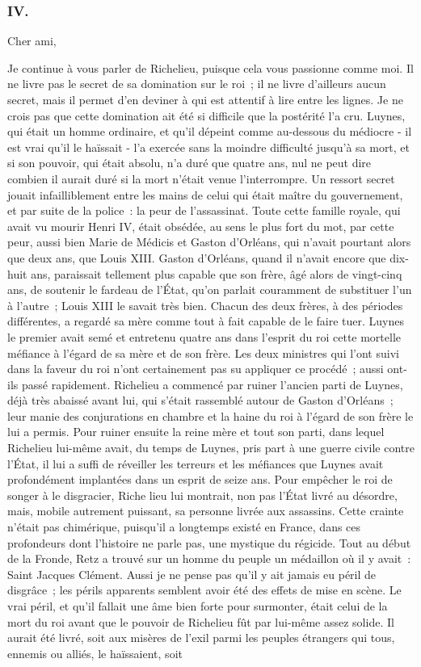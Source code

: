 \documentclass[french,twoside]{book} %
\begin{document}
\subsubsection[IV.]{IV.}
\noindent Cher ami,\par
Je continue à vous parler de Richelieu, puisque cela vous passionne com­me moi. Il ne livre pas le secret de sa domination sur le roi ; il ne livre d'ailleurs aucun secret, mais il permet d'en deviner à qui est attentif à lire entre les lignes. Je ne crois pas que cette domination ait été si difficile que la postérité l'a cru. Luynes, qui était un homme ordinaire, et qu'il dépeint comme au-dessous du médiocre - il est vrai qu'il le haïssait - l'a exercée sans la moindre difficulté jusqu'à sa mort, et si son pouvoir, qui était absolu, n'a duré que quatre ans, nul ne peut dire combien il aurait duré si la mort n'était venue l'interrompre. Un ressort secret jouait infailliblement entre les mains de celui qui était maître du gouvernement, et par suite de la police : la peur de l'assas­sinat. Toute cette famille royale, qui avait vu mourir Henri IV, était obsédée, au sens le plus fort du mot, par cette peur, aussi bien Marie de Médicis et Gaston d'Orléans, qui n'avait pourtant alors que deux ans, que Louis XIII. Gaston d'Orléans, quand il n'avait encore que dix-huit ans, paraissait tellement plus capable que son frère, âgé alors de vingt-cinq ans, de soutenir le fardeau de l'État, qu'on parlait couramment de substituer l'un à l'autre ; Louis XIII le savait très bien. Chacun des deux frères, à des périodes différentes, a regardé sa mère comme tout à fait capable de le faire tuer. Luynes le premier avait semé et entretenu quatre ans dans l'esprit du roi cette mortelle méfiance à l'égard de sa mère et de son frère. Les deux ministres qui l'ont suivi dans la faveur du roi n'ont certainement pas su appliquer ce procédé ; aussi ont-ils passé rapidement. Richelieu a commencé par ruiner l'ancien parti de Luynes, déjà très abaissé avant lui, qui s'était rassemblé autour de Gaston d'Orléans ; leur manie des conjurations en chambre et la haine du roi à l'égard de son frère le lui a permis. Pour ruiner ensuite la reine mère et tout son parti, dans lequel Richelieu lui-même avait, du temps de Luynes, pris part à une guerre civile contre l'État, il lui a suffi de réveiller les terreurs et les méfiances que Luynes avait profondément implantées dans un esprit de seize ans. Pour empêcher le roi de songer à le disgracier, Riche lieu lui montrait, non pas l'État livré au désordre, mais, mobile autrement puissant, sa personne livrée aux assassins. Cette crainte n'était pas chimérique, puisqu'il a longtemps existé en France, dans ces profondeurs dont l'histoire ne parle pas, une mystique du régicide. Tout au début de la Fronde, Retz a trouvé sur un homme du peuple un mé­daillon où il y avait : Saint Jacques Clément. Aussi je ne pense pas qu'il y ait jamais eu péril de disgrâce ; les périls apparents semblent avoir été des effets de mise en scène. Le vrai péril, et qu'il fallait une âme bien forte pour surmon­ter, était celui de la mort du roi avant que le pouvoir de Richelieu fût par lui-même assez solide. Il aurait été livré, soit aux misères de l'exil parmi les peuples étrangers qui tous, ennemis ou alliés, le haïssaient, soit 
\end{document}

